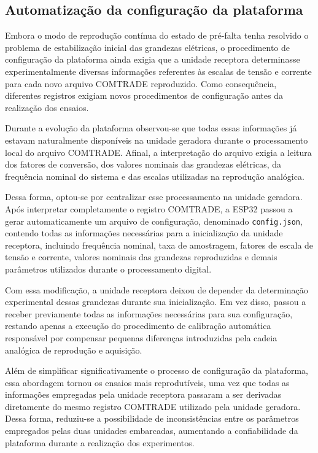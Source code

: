 \subsection{Automatização da configuração da plataforma}

Embora o modo de reprodução contínua do estado de pré-falta tenha resolvido o problema de estabilização inicial das grandezas elétricas, o procedimento de configuração da plataforma ainda exigia que a unidade receptora determinasse experimentalmente diversas informações referentes às escalas de tensão e corrente para cada novo arquivo COMTRADE reproduzido. Como consequência, diferentes registros exigiam novos procedimentos de configuração antes da realização dos ensaios.

Durante a evolução da plataforma observou-se que todas essas informações já estavam naturalmente disponíveis na unidade geradora durante o processamento local do arquivo COMTRADE. Afinal, a interpretação do arquivo exigia a leitura dos fatores de conversão, dos valores nominais das grandezas elétricas, da frequência nominal do sistema e das escalas utilizadas na reprodução analógica.

Dessa forma, optou-se por centralizar esse processamento na unidade geradora. Após interpretar completamente o registro COMTRADE, a ESP32 passou a gerar automaticamente um arquivo de configuração, denominado \texttt{config.json}, contendo todas as informações necessárias para a inicialização da unidade receptora, incluindo frequência nominal, taxa de amostragem, fatores de escala de tensão e corrente, valores nominais das grandezas reproduzidas e demais parâmetros utilizados durante o processamento digital.

Com essa modificação, a unidade receptora deixou de depender da determinação experimental dessas grandezas durante sua inicialização. Em vez disso, passou a receber previamente todas as informações necessárias para sua configuração, restando apenas a execução do procedimento de calibração automática responsável por compensar pequenas diferenças introduzidas pela cadeia analógica de reprodução e aquisição.

Além de simplificar significativamente o processo de configuração da plataforma, essa abordagem tornou os ensaios mais reprodutíveis, uma vez que todas as informações empregadas pela unidade receptora passaram a ser derivadas diretamente do mesmo registro COMTRADE utilizado pela unidade geradora. Dessa forma, reduziu-se a possibilidade de inconsistências entre os parâmetros empregados pelas duas unidades embarcadas, aumentando a confiabilidade da plataforma durante a realização dos experimentos.

